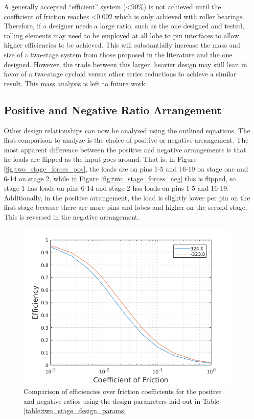 A generally accepted ``efficient'' system (\textless90\%) is not achieved until the coefficient of friction reaches \textless0.002 which is only achieved with roller bearings. Therefore, if a designer needs a large ratio, such as the one designed and tested, rolling elements may need to be employed at all lobe to pin interfaces to allow higher efficiencies to be achieved. This will substantially increase the mass and size of a two-stage system from those proposed in the literature and the one designed. However, the trade between this larger, heavier design may still lean in favor of a two-stage cycloid versus other series reductions to achieve a similar result. This mass analysis is left to future work. 

\subsection{Positive and Negative Ratio Arrangement}\label{ch:dual:discussion:pos_neg}

Other design relationships can now be analyzed using the outlined equations. The first comparison to analyze is the choice of positive or negative arrangement. The most apparent difference between the positive and negative arrangements is that he loads are flipped as the input goes around. That is, in Figure \ref{fig:two_stage_forces_pos}, the loads are on pins 1-5 and 16-19 on stage one and 6-14 on stage 2, while in Figure \ref{fig:two_stage_forces_neg} this is flipped, so stage 1 has loads on pins 6-14 and stage 2 has loads on pins 1-5 and 16-19. Additionally, in the positive arrangement, the load is slightly lower per pin on the first stage because there are more pins and lobes and higher on the second stage. This is reversed in the negative arrangement. 

\begin{figure}[t]
	\centering
	\includegraphics[width=0.75\linewidth]{fig/two_stage_pos_neg}
   \caption{Comparison of efficiencies over friction coefficients for the positive and negative ratios using the design parameters laid out in Table \ref{table:two_stage_design_params}}
   \label{fig:two_stage_pos_neg}
\end{figure}

